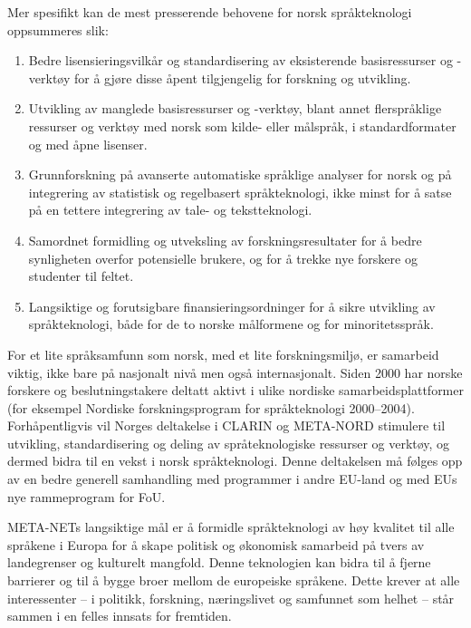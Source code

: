 \begin{multicols}{2}
Mer spesifikt kan de mest presserende behovene for norsk språkteknologi oppsummeres slik:
\begin{enumerate}
\item Bedre lisensieringsvilkår og standardisering av eksisterende basisressurser og -verktøy for å gjøre disse åpent tilgjengelig for forskning og utvikling.
\item Utvikling av manglede basisressurser og -verktøy, blant annet flerspråklige ressurser og verktøy med norsk som kilde- eller målspråk, i standardformater og med åpne lisenser.
\item Grunnforskning på avanserte automatiske språklige analyser for norsk og på integrering av statistisk og regelbasert språkteknologi, ikke minst for å satse på en tettere integrering av tale- og tekstteknologi.
\item Samordnet formidling og utveksling av forskningsresultater for å bedre synligheten overfor potensielle brukere, og for å trekke nye forskere og studenter til feltet.
\item Langsiktige og forutsigbare finansieringsordninger for å sikre utvikling av språkteknologi, både for de to norske målformene og for minoritetsspråk.
\end{enumerate}

For et lite språksamfunn som norsk, med et lite forskningsmiljø, er samarbeid viktig, ikke bare på nasjonalt nivå men også internasjonalt. Siden 2000 har norske forskere og beslutningstakere deltatt aktivt i ulike nordiske samarbeidsplattformer  (for eksempel Nordiske forskningsprogram for språkteknologi 2000--2004). Forhåpentligvis vil Norges deltakelse i CLARIN og META-NORD stimulere til utvikling, standardisering og deling av språteknologiske ressurser og verktøy, og dermed bidra til en vekst i norsk språkteknologi.
Denne deltakelsen må følges opp av en bedre generell samhandling med programmer i andre EU-land og med EUs nye rammeprogram for FoU.



META-NETs langsiktige mål er å formidle språkteknologi av høy kvalitet til alle språkene i Europa for å skape politisk og økonomisk samarbeid på tvers av landegrenser og kulturelt mangfold. Denne teknologien kan bidra til å fjerne barrierer og til å bygge broer mellom de europeiske språkene. Dette krever at alle interessenter – i politikk, forskning, næringslivet og samfunnet som helhet – står sammen i en felles innsats for fremtiden.

\end{multicols}

